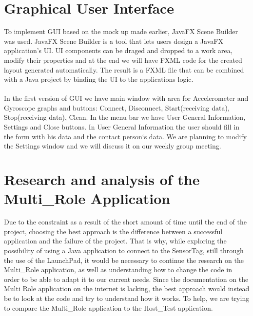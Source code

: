 \documentclass[conference,12pt]{IEEETran}
\begin{document}
\section{Graphical User Interface} 
To implement GUI based on the mock up made earlier, JavaFX Scene Builder\cite{JavaFX} was used. JavaFX Scene Builder is a tool that lets users design a JavaFX application's UI. UI components can be draged and dropped to a work area, modify their properties and at the end we will have FXML code for the created layout generated automatically. The result is a FXML file that can be combined with a Java project by binding the UI to the applications logic. \\\\
In the first version of GUI we have main window with area for Accelerometer and Gyroscope graphs and buttons: Connect, Disconnect, Start(receiving data), Stop(receiving data), Clean. In the menu bar we have User General Information, Settings and Close buttons. In User General Information the user should fill in the form with his data and the contact person`s data. We are planning to modify the Settings window and we will discuss it on our weekly group meeting.

\section{Research and analysis of the Multi\_Role Application}
Due to the constraint as a result of the short amount of time until the end of the project, choosing the best approach is the difference between a successful application and the failure of the project. That is why, while exploring the possibility of using a Java application to connect to the SensorTag, still through the use of the LaunchPad, it would be necessary to continue the research on the Multi\_Role application, as well as understanding how to change the code in order to be able to adapt it to our current needs. Since the documentation on the Multi Role application on the internet is lacking, the best approach would instead be to look at the code and try to understand how it works. To help, we are trying to compare the Multi\_Role application to the Host\_Test application.\\
\end{document}
